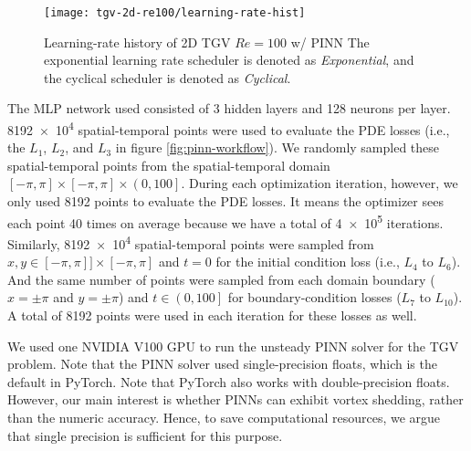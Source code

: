 \begin{figure}
    \centering%
    \texttt{[image: tgv-2d-re100/learning-rate-hist]}%
    \caption{%
        Learning-rate history of 2D TGV $Re=\num{100}$ w/ PINN
        The exponential learning rate scheduler is denoted as {\it Exponential}, and the cyclical scheduler is denoted as {\it Cyclical}.
    }
    \label{fig:tgv-learning-rate-hist}%
\end{figure}

The MLP network used consisted of \num{3} hidden layers and \num{128} neurons per layer.
\num{8192e4} spatial-temporal points were used to evaluate the PDE losses (i.e., the $L_1$, $L_2$, and $L_3$ in figure \ref{fig:pinn-workflow}).
We randomly sampled these spatial-temporal points from the spatial-temporal domain$\left[-\pi, \pi\right] \times \left[-\pi, \pi\right] \times \left(0, 100\right]$.
During each optimization iteration, however, we only used \num{8192} points to evaluate the PDE losses.
It means the optimizer sees each point \num{40} times on average because we have a total of \num{4e5} iterations.
Similarly, \num{8192e4} spatial-temporal points were sampled from $x,y \in \left[-\pi, \pi\right] ] \times \left[-\pi, \pi\right]$ and $t=0$ for the initial condition loss (i.e., $L_4$ to $L_6$).
And the same number of points were sampled from each domain boundary ($x=\pm\pi$ and $y=\pm\pi$) and $t\in\left(0, 100\right]$ for boundary-condition losses ($L_7$ to $L_{10}$).
A total of \num{8192} points were used in each iteration for these losses as well.

We used one NVIDIA V100 GPU to run the unsteady PINN solver for the TGV problem.
Note that the PINN solver used single-precision floats, which is the default in PyTorch.
Note that PyTorch also works with double-precision floats.
However, our main interest is whether PINNs can exhibit vortex shedding, rather than the numeric accuracy.
Hence, to save computational resources, we argue that single precision is sufficient for this purpose.

